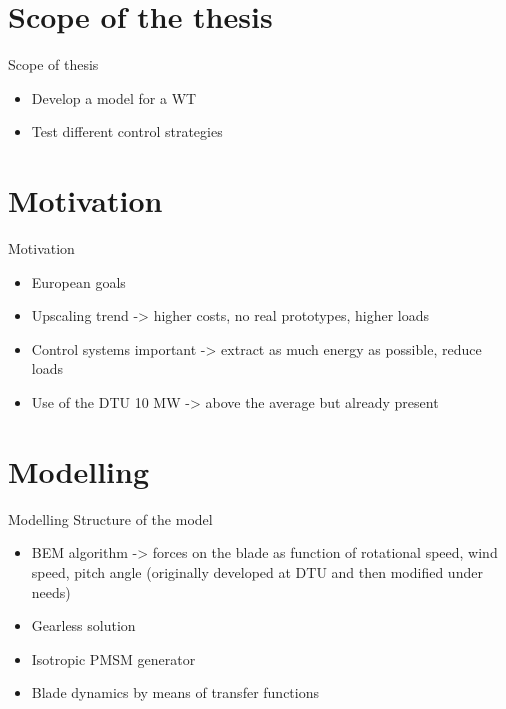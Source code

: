 \section{Scope of the thesis}
\begin{frame}{Scope of thesis}
  \begin{itemize}
    \item Develop a model for a WT
    \item Test different control strategies
  \end{itemize}
\end{frame}

                                                    
\section{Motivation}
\begin{frame}{Motivation}
  \begin{itemize}
    \item European goals
    \item Upscaling trend -> higher costs, no real prototypes, higher loads
    \item Control systems important -> extract as much energy as possible, reduce loads
    \item Use of the DTU 10 MW -> above the average but already present
  \end{itemize}
\end{frame}


\section{Modelling}
\begin{frame}{Modelling}
  Structure of the model
  \begin{itemize}
    \item BEM algorithm -> forces on the blade as function of rotational speed, wind speed, pitch angle (originally developed at DTU and then modified under needs)
    \item Gearless solution
    \item Isotropic PMSM generator
    \item Blade dynamics by means of transfer functions
  \end{itemize}
\end{frame}

